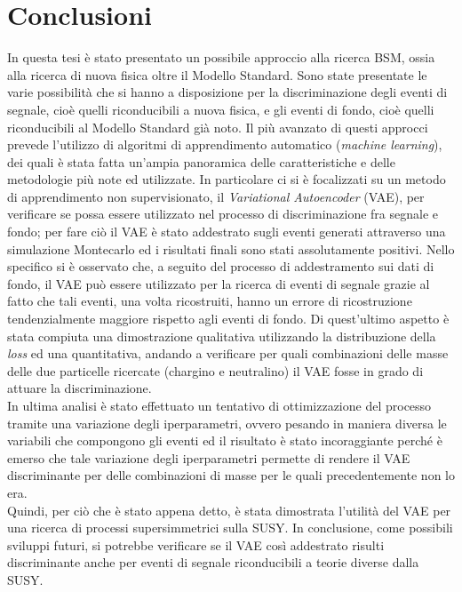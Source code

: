 
\section{Conclusioni}
\label{sec:conclusioni}

In questa tesi è stato presentato un possibile approccio alla ricerca BSM, ossia alla ricerca di nuova fisica oltre il Modello Standard. Sono state presentate le varie possibilità che si hanno a disposizione per la discriminazione degli eventi di segnale, cioè quelli riconducibili a nuova fisica, e gli eventi di fondo, cioè quelli riconducibili al Modello Standard già noto. Il più avanzato di questi approcci prevede l'utilizzo di algoritmi di apprendimento automatico (\textit{machine learning}), dei quali è stata fatta un'ampia panoramica delle caratteristiche e delle metodologie più note ed utilizzate. In particolare ci si è focalizzati su un metodo di apprendimento non supervisionato, il \textit{Variational Autoencoder} (VAE), per verificare se possa essere utilizzato nel processo di discriminazione fra segnale e fondo; per fare ciò il VAE è stato addestrato sugli eventi generati attraverso una simulazione Montecarlo ed i risultati finali sono stati assolutamente positivi. Nello specifico si è osservato che, a seguito del processo di addestramento sui dati di fondo, il VAE può essere utilizzato per la ricerca di eventi di segnale grazie al fatto che tali eventi, una volta ricostruiti, hanno un errore di ricostruzione tendenzialmente maggiore rispetto agli eventi di fondo. Di quest'ultimo aspetto è stata compiuta una dimostrazione qualitativa utilizzando la distribuzione della \textit{loss} ed una quantitativa, andando a verificare per quali combinazioni delle masse delle due particelle ricercate (chargino e neutralino) il VAE fosse in grado di attuare la discriminazione.\\
In ultima analisi è stato effettuato un tentativo di ottimizzazione del processo tramite una variazione degli iperparametri, ovvero pesando in maniera diversa le variabili che compongono gli eventi ed il risultato è stato incoraggiante perché è emerso che tale variazione degli iperparametri permette di rendere il VAE discriminante per delle combinazioni di masse per le quali precedentemente non lo era.\\
Quindi, per ciò che è stato appena detto, è stata dimostrata l'utilità del VAE per una ricerca di processi supersimmetrici sulla SUSY. In conclusione, come possibili sviluppi futuri, si potrebbe verificare se il VAE così addestrato risulti discriminante anche per eventi di segnale riconducibili a teorie diverse dalla SUSY.
